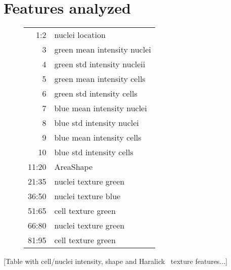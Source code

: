 \documentclass[oneside, a4paper, draft]{memoir} %
\begin{document}
\chapter{Features analyzed}\label{app:featurelist}
\begin{figure}[here]
\centering
\begin{tabular}{rl}
	1:2 & nuclei location\\

	3 & green mean intensity nuclei\\
	4 & green std intensity nucleii\\

	5 & green mean intensity cells\\
	6 & green std intensity cells\\

	7 & blue mean intensity nuclei\\
	8 & blue std intensity nuclei\\

	9 & blue mean intensity cells\\
	10 & blue std intensity cells\\

	11:20 & AreaShape\\


	21:35 & nuclei texture green\\
	36:50 & nuclei texture blue\\
	51:65 & cell texture green\\

	66:80 & nuclei texture green\\
	81:95 & cell texture green
\end{tabular}
\end{figure}
[Table with cell/nuclei intensity, shape and Haralick~\cite{haralick1973textural} texture features...]
\end{document}
